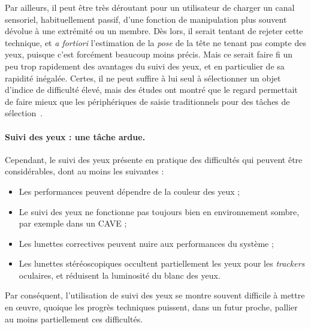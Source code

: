 	Par ailleurs, il peut être très déroutant pour un utilisateur de \og charger \fg{} un canal sensoriel, habituellement passif\footnotemark{}, d'une fonction de manipulation plus souvent dévolue à une extrémité ou un membre. Dès lors, il serait tentant de rejeter cette technique, et \emph{a fortiori} l'estimation de la \emph{pose} de la tête ne tenant pas compte des yeux, puisque c'est forcément beaucoup moins précis. Mais ce serait faire fi un peu trop rapidement des avantages du suivi des yeux, et en particulier de sa rapidité inégalée. Certes, il ne peut suffire à lui seul à sélectionner un objet d'indice de difficulté élevé, mais des études ont montré que le regard permettait de faire mieux que les périphériques de saisie traditionnels pour des tâches de sélection~\cite{stellmach2012look, ware1987evaluation, smith2000hand, bieg2010eye}.
	
	
	\paragraph{Suivi des yeux : une tâche ardue.}

	Cependant, le suivi des yeux présente en pratique des difficultés qui peuvent être considérables, dont au moins les suivantes :
	
	\begin{itemize}
		\item Les performances peuvent dépendre de la couleur des yeux ;
		\item Le suivi des yeux ne fonctionne pas toujours bien en environnement sombre, par exemple dans un CAVE ;
		\item Les lunettes correctives peuvent nuire aux performances du système ;
		\item Les lunettes stéréoscopiques occultent partiellement les yeux pour les \emph{trackers} oculaires, et réduisent la luminosité du blanc des yeux.
	\end{itemize}

	Par conséquent, l'utilisation de suivi des yeux se montre souvent difficile à mettre en œuvre, quoique les progrès techniques puissent, dans un futur proche, pallier au moins partiellement ces difficultés.
	
